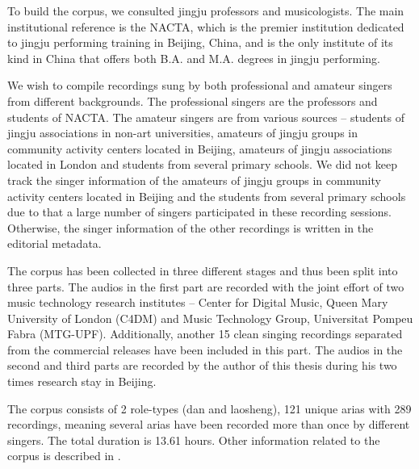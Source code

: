 To build the corpus, we consulted jingju professors and musicologists. The main institutional reference is the \gls{NACTA}, which is the premier institution dedicated to jingju performing training in Beijing, China, and is the only institute of its kind in China that offers both B.A. and M.A. degrees in jingju performing.

We wish to compile recordings sung by both professional and amateur singers from different backgrounds. The professional singers are the professors and students of \gls{NACTA}. The amateur singers are from various sources -- students of jingju associations in non-art universities, amateurs of jingju groups in community activity centers located in Beijing, amateurs of jingju associations located in London and students from several primary schools. We did not keep track the singer information of the amateurs of jingju groups in community activity centers located in Beijing and the students from several primary schools due to that a large number of singers participated in these recording sessions. Otherwise, the singer information of the other recordings is written in the editorial metadata. 

The corpus has been collected in three different stages and thus been split into three parts. The audios in the first part are recorded with the joint effort of two music technology research institutes -- Center for Digital Music, Queen Mary University of London (C4DM) \cite{Black2014} and Music Technology Group, Universitat Pompeu Fabra (MTG-UPF). Additionally, another 15 clean singing recordings separated from the commercial releases have been included in this part. The audios in the second and third parts are recorded by the author of this thesis during his two times research stay in Beijing.

The corpus consists of 2 role-types (\gls{dan} and \gls{laosheng}), 121 unique arias with 289 recordings, meaning several arias have been recorded more than once by different singers. The total duration is 13.61 hours. Other information related to the corpus is described in .

